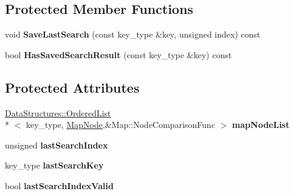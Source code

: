 \subsection*{Protected Member Functions}
\begin{DoxyCompactItemize}
\item 
\hypertarget{class_data_structures_1_1_map_a5b781a91324274f597aaabde5b3d6c51}{void {\bfseries Save\-Last\-Search} (const key\-\_\-type \&key, unsigned index) const }\label{class_data_structures_1_1_map_a5b781a91324274f597aaabde5b3d6c51}

\item 
\hypertarget{class_data_structures_1_1_map_ab3fd77fe360c86c40332ee05d2dcfeed}{bool {\bfseries Has\-Saved\-Search\-Result} (const key\-\_\-type \&key) const }\label{class_data_structures_1_1_map_ab3fd77fe360c86c40332ee05d2dcfeed}

\end{DoxyCompactItemize}
\subsection*{Protected Attributes}
\begin{DoxyCompactItemize}
\item 
\hypertarget{class_data_structures_1_1_map_a6da1ceaa9a89aacf8469576a09e2bb33}{\hyperlink{class_data_structures_1_1_ordered_list}{Data\-Structures\-::\-Ordered\-List}\\*
$<$ key\-\_\-type, \hyperlink{struct_data_structures_1_1_map_1_1_map_node}{Map\-Node},\&Map\-::\-Node\-Comparison\-Func $>$ {\bfseries map\-Node\-List}}\label{class_data_structures_1_1_map_a6da1ceaa9a89aacf8469576a09e2bb33}

\item 
\hypertarget{class_data_structures_1_1_map_a56fa2a6d431b06152fb0cd9b9f7ae1e5}{unsigned {\bfseries last\-Search\-Index}}\label{class_data_structures_1_1_map_a56fa2a6d431b06152fb0cd9b9f7ae1e5}

\item 
\hypertarget{class_data_structures_1_1_map_aceac06eff85ef63c2e1e49e65e74f0f3}{key\-\_\-type {\bfseries last\-Search\-Key}}\label{class_data_structures_1_1_map_aceac06eff85ef63c2e1e49e65e74f0f3}

\item 
\hypertarget{class_data_structures_1_1_map_acf98e8afa54e3a773569f719802bb47a}{bool {\bfseries last\-Search\-Index\-Valid}}\label{class_data_structures_1_1_map_acf98e8afa54e3a773569f719802bb47a}

\end{DoxyCompactItemize}



